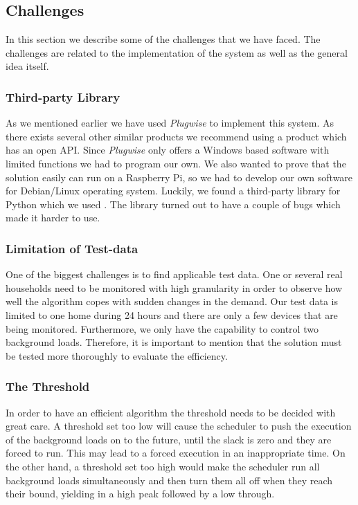 \subsection{Challenges}
\label{sec:challenges}
In this section we describe some of the challenges that we have faced. The challenges are related to the implementation of the system as well as the general idea itself.

\subsubsection{Third-party Library}
As we mentioned earlier we have used \emph{Plugwise} to implement this system. As there exists several other similar products we recommend using a product which has an open API. Since \emph{Plugwise} only offers a Windows based software with limited functions we had to program our own. We also wanted to prove that the solution easily can run on a Raspberry Pi, so we had to develop our own software for Debian/Linux operating system. Luckily, we found a third-party library for Python which we used \cite{hadaraplugwise}. The library turned out to have a couple of bugs which made it harder to use.

\subsubsection{Limitation of Test-data}
One of the biggest challenges is to find applicable test data. One or several real households need to be monitored with high granularity in order to observe how well the algorithm copes with sudden changes in the demand. Our test data is limited to one home during 24 hours and there are only a few devices that are being monitored. Furthermore, we only have the capability to control two background loads. Therefore, it is important to mention that the solution must be tested more thoroughly to evaluate the efficiency.

\subsubsection{The Threshold}
In order to have an efficient algorithm the threshold needs to be decided with great care. A threshold set too low will cause the scheduler to push the execution of the background loads on to the future, until the slack is zero and they are forced to run. This may lead to a forced execution in an inappropriate time. On the other hand, a threshold set too high would make the scheduler run all background loads simultaneously and then turn them all off when they reach their bound, yielding in a high peak followed by a low through.

